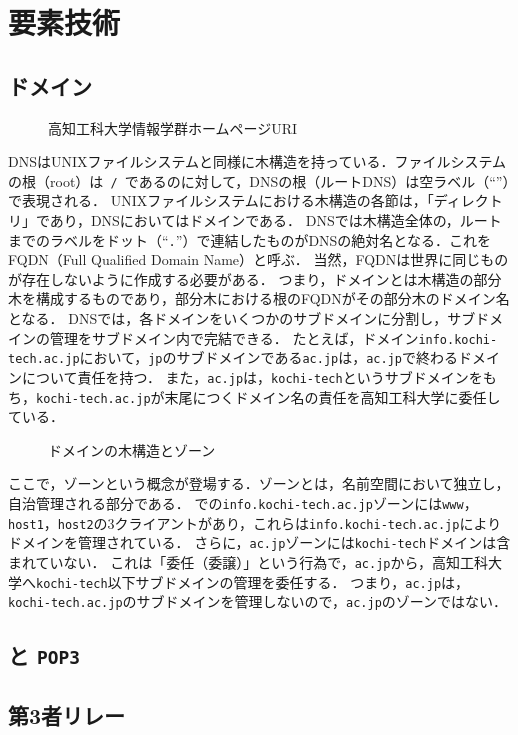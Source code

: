 \section{要素技術}
\subsection{ドメイン}\label{chap:domain}
\newcommand{\popt}{\texttt{POP3}}
\begin{wrapfigure}{r}[0mm]{.55\textwidth}
    \vspace{-.5cm}
    \centering
    
    \vspace{1em}
    \caption{高知工科大学情報学群ホームページURI}
\end{wrapfigure}
DNSはUNIXファイルシステムと同様に木構造を持っている．ファイルシステムの根（root）は\texttt{\ /\ }であるのに対して，DNSの根（ルートDNS）は空ラベル（``''）で表現される．
UNIXファイルシステムにおける木構造の各節は，「ディレクトリ」であり，DNSにおいてはドメインである．
DNSでは木構造全体の，ルートまでのラベルをドット（``\texttt{.}''）で連結したものがDNSの絶対名となる．これをFQDN（Full Qualified Domain Name）と呼ぶ．
当然，FQDNは世界に同じものが存在しないように作成する必要がある．
つまり，ドメインとは木構造の部分木を構成するものであり，部分木における根のFQDNがその部分木のドメイン名となる．
DNSでは，各ドメインをいくつかのサブドメインに分割し，サブドメインの管理をサブドメイン内で完結できる．
たとえば，ドメイン\texttt{info.kochi-tech.ac.jp}において，\texttt{jp}のサブドメインである\texttt{ac.jp}は，\texttt{ac.jp}で終わるドメインについて責任を持つ．
また，\texttt{ac.jp}は，\texttt{kochi-tech}というサブドメインをもち，\texttt{kochi-tech.ac.jp}が末尾につくドメイン名の責任を高知工科大学に委任している．

\begin{wrapfigure}{r}[0mm]{.62\textwidth}
    \centering
    
    \caption{ドメインの木構造とゾーン}
    \label{fig:ドメインの木構造とゾーン}
\end{wrapfigure}
ここで，ゾーンという概念が登場する．ゾーンとは，名前空間において独立し，自治管理される部分である．
での\texttt{info.kochi-tech.ac.jp}ゾーンには\texttt{www}，\texttt{host1}，\texttt{host2}の3クライアントがあり，これらは\texttt{info.kochi-tech.ac.jp}によりドメインを管理されている．
さらに，\texttt{ac.jp}ゾーンには\texttt{kochi-tech}ドメインは含まれていない．
これは「委任（委譲）」という行為で，\texttt{ac.jp}から，高知工科大学へ\texttt{kochi-tech}以下サブドメインの管理を委任する．
つまり，\texttt{ac.jp}は，\texttt{kochi-tech.ac.jp}のサブドメインを管理しないので，\texttt{ac.jp}のゾーンではない．
\subsection{\smtp と \popt}
\subsection{第3者リレー}